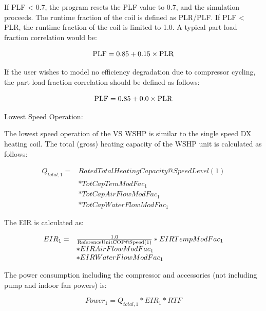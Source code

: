 If PLF \textless{} 0.7, the program resets the PLF value to 0.7, and the simulation proceeds. The runtime fraction of the coil is defined as PLR/PLF. If PLF \textless{} PLR, the runtime fraction of the coil is limited to 1.0. A typical part load fraction correlation would be:

\begin{equation}
{\rm{PLF}} = 0.85 + 0.15 \times {\rm{PLR}}
\end{equation}

If the user wishes to model no efficiency degradation due to compressor cycling, the part load fraction correlation should be defined as follows:

\begin{equation}
{\rm{PLF}} = 0.85 + 0.0 \times {\rm{PLR}}
\end{equation}

Lowest Speed Operation:

The lowest speed operation of the VS WSHP is similar to the single speed DX heating coil. The total (gross) heating capacity of the WSHP unit is calculated as follows:

\begin{equation}
\begin{array}{rl}
{Q_{total,1}} =& RatedTotalHeatingCapacity@SpeedLevel\left( 1 \right) \\
               &*TotCapTemModFa{c_1} \\
               &*TotCapAirFlowModFa{c_1} \\
               &*TotCapWaterFlowModFa{c_1}
\end{array}
\end{equation}

The EIR is calculated as:

\begin{equation}
  \begin{array}{rl}
    EIR_1 =& \frac{1.0}{\rm{ReferenceUnitCOP@Speed(1)}} * EIRTempModFac_1 \\
          &* EIRAirFlowModFac_1 \\
          &* EIRWaterFlowModFac_1
  \end{array}
\end{equation}

The power consumption including the compressor and accessories (not including pump and indoor fan powers) is:

\begin{equation}
Powe{r_1} = {Q_{total,1}}*EI{R_1}*RTF
\end{equation}

